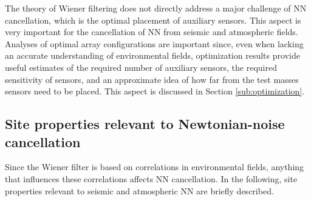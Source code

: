The theory of Wiener filtering does not directly address a major challenge of NN cancellation, which is the optimal placement of auxiliary sensors. This aspect is very important for the cancellation of NN from seismic and atmospheric fields. Analyses of optimal array configurations are important since, even when lacking an accurate understanding of environmental fields, optimization results provide useful estimates of the required number of auxiliary sensors, the required sensitivity of sensors, and an approximate idea of how far from the test masses sensors need to be placed. This aspect is discussed in Section \ref{sub:optimization}.

\subsection{Site properties relevant to Newtonian-noise cancellation}
\label{sub:properties}
Since the Wiener filter is based on correlations in environmental fields, anything that influences these correlations affects NN cancellation. In the following, site properties relevant to seismic and atmospheric NN are briefly described.

